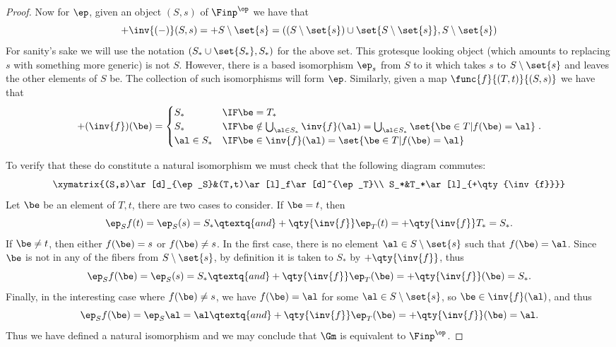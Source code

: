 \documentclass[main.tex]{subfiles}
\begin{document}
\begin{proof}
	Now for \(\ep\), given an object \((S,s)\) of \(\Finp^\op\) we have that
	\[+\inv{(-)}(S,s)=+S\setminus\set{s}=((S\setminus\set{s})
	\cup\set{S\setminus\set{s}},S\setminus\set{s})\]
	For sanity's sake we will use the notation \((S_*\cup\set{S_*},S_*)\) for
	the above set. This grotesque looking object (which amounts to replacing
	\(s\) with something more generic) is not \(S\). However, there is a based
	isomorphism \(\ep_s\) from \(S\) to it which takes \(s\) to
	\(S\setminus\set{s}\) and leaves the other elements of \(S\) be. The
	collection of such isomorphisms will form \(\ep\). Similarly, given a map
	\(\func{f}{(T,t)}{(S,s)}\) we have that
	\[+(\inv{f})(\be)=\begin{cases}
			S_* & \IF \be=T_* \\
			S_* & \IF \be\notin\bigcup_{\al\in S_*}\inv{f}(\al)=
			\bigcup_{\al\in S_*}\set{\be\in T|f(\be)=\al}\\
			\al\in S_* & \IF \be\in\inv{f}(\al)=\set{\be\in T|f(\be)=\al}
	\end{cases}.\]

	To verify that these do constitute a natural isomorphism we must check that
	the following diagram commutes:
	\[\xymatrix{(S,s)\ar[d]_{\ep_S}&(T,t)\ar[l]_f\ar[d]^{\ep_T}\\
	S_*&T_*\ar[l]_{+\qty{\inv{f}}}}\]
	Let \(\be\) be an element of \(T,t\), there are two cases to consider. If
	\(\be=t\), then
	\[\ep_Sf(t)=\ep_S(s)=S_*\qtextq{and}
	+\qty{\inv{f}}\ep_T(t)=+\qty{\inv{f}}T_*=S_*.\] If \(\be\neq t\), then
	either \(f(\be)=s\) or \(f(\be)\neq s\). In the first case, there is no element
	\(\al\in S\setminus\set{s}\) such that \(f(\be)=\al\). Since \(\be\) is not in
	any of the fibers from \(S\setminus\set{s}\), by definition it is taken to
	\(S_*\) by \(+\qty{\inv{f}}\), thus \[\ep_Sf(\be)=\ep_S(s)=S_*\qtextq{and}
	+\qty{\inv{f}}\ep_T(\be)=+\qty{\inv{f}}(\be)=S_*.\] Finally, in the
	interesting case where \(f(\be)\neq s\), we have \(f(\be)=\al\) for some
	\(\al\in S\setminus\set{s}\), so \(\be\in\inv{f}(\al)\), and thus
	\[\ep_Sf(\be)=\ep_S\al=\al\qtextq{and}
	+\qty{\inv{f}}\ep_T(\be)=+\qty{\inv{f}}(\be)=\al.\] Thus we have defined a
	natural isomorphism and we may conclude that \(\Gm\) is equivalent to
	\(\Finp^\op\).
\end{proof}
\end{document}
